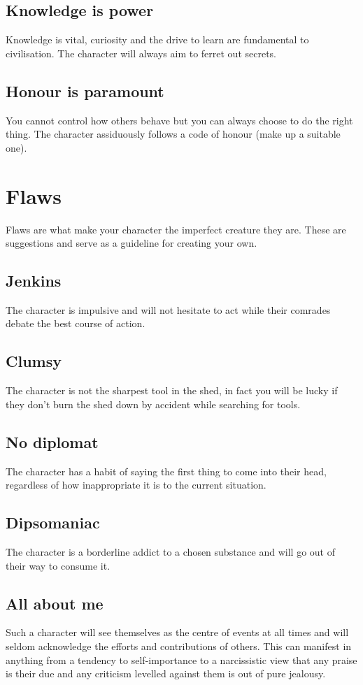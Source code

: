 \documentclass[a4paper,10pt,oneside]{book}
\begin{document}
\subsection{Knowledge is power}
Knowledge is vital, curiosity and the drive to learn are fundamental to civilisation. The character will always aim to ferret out secrets.

\subsection{Honour is paramount}
You cannot control how others behave but you can always choose to do the right thing. The character assiduously follows a code of honour (make up a suitable one).



\section{Flaws}
\label{sec:flaws}
Flaws are what make your character the imperfect creature they are. These are suggestions and serve as a guideline for creating your own.

\subsection{Jenkins}
The character is impulsive and will not hesitate to act while their comrades debate the best course of action.

\subsection{Clumsy}
The character is not the sharpest tool in the shed, in fact you will be lucky if they don't burn the shed down by accident while searching for tools.

\subsection{No diplomat}
The character has a habit of saying the first thing to come into their head, regardless of how inappropriate it is to the current situation.

\subsection{Dipsomaniac}
The character is a borderline addict to a chosen substance and will go out of their way to consume it.

\subsection{All about me}
Such a character will see themselves as the centre of events at all times and will seldom acknowledge the efforts and contributions of others. This can manifest in anything from a tendency to self-importance to a narcissistic view that any praise is their due and any criticism levelled against them is out of pure jealousy. 
\end{document}
